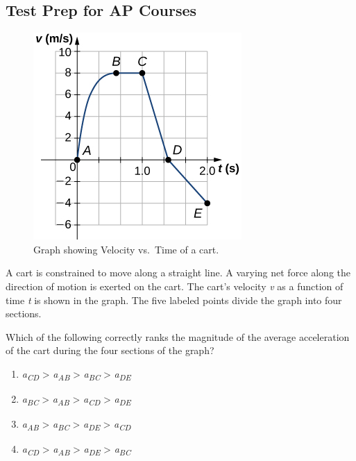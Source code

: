 \documentclass[
]{book}
\providecommand{\tightlist}{%
  \setlength{\itemsep}{0pt}\setlength{\parskip}{0pt}}
\newenvironment{ap-test-prep}{}{}
\begin{document}
\hypertarget{fs-id1922895}{}
\begin{ap-test-prep}

\hypertarget{test-prep-for-ap-courses-3}{%
\subsection{Test Prep for AP Courses}\label{test-prep-for-ap-courses-3}}

\hypertarget{fs-id1454119}{}
\leavevmode\hypertarget{fs-id3184331}{}%
\begin{figure}
\hypertarget{fs-id3184333}{%
\centering
\includegraphics{images/Figure_Ch2_M4_14.jpg}
\caption{Graph showing Velocity vs.~Time of a
cart.}\label{fs-id3184333}
}
\end{figure}

A cart is constrained to move along a straight line. A varying net force
along the direction of motion is exerted on the cart. The cart's
velocity \emph{v} as a function of time \emph{t} is shown in the graph. The five
labeled points divide the graph into four sections.

Which of the following correctly ranks the magnitude of the average
acceleration of the cart during the four sections of the graph?

\begin{enumerate}
\def\labelenumi{\alph{enumi}.}
\tightlist
\item
  \emph{a\textsubscript{CD}} \textgreater{} \emph{a\textsubscript{AB}} \textgreater{} \emph{a\textsubscript{BC}} \textgreater{} \emph{a\textsubscript{DE}}
\item
  \emph{a\textsubscript{BC}} \textgreater{} \emph{a\textsubscript{AB}} \textgreater{} \emph{a\textsubscript{CD}} \textgreater{} \emph{a\textsubscript{DE}}
\item
  \emph{a\textsubscript{AB}} \textgreater{} \emph{a\textsubscript{BC}} \textgreater{} \emph{a\textsubscript{DE}} \textgreater{} \emph{a\textsubscript{CD}}
\item
  \emph{a\textsubscript{CD}} \textgreater{} \emph{a\textsubscript{AB}} \textgreater{} \emph{a\textsubscript{DE}} \textgreater{} \emph{a\textsubscript{BC}}
\end{enumerate}


\end{ap-test-prep}
\end{document}
